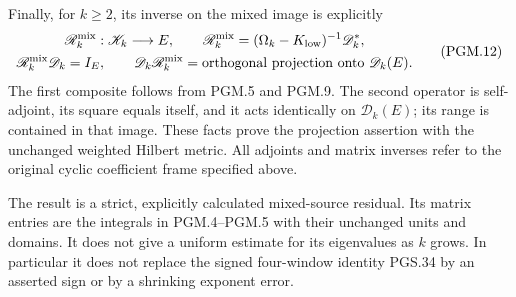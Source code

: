 Finally, for \(k\geq2\), its inverse on the mixed image is explicitly
\[
\begin{gathered}
 \mathscr R_k^{\rm mix}:\mathscr K_k\longrightarrow E,\qquad
 \mathscr R_k^{\rm mix}=(\Omega_k-K_{\rm low})^{-1}\mathscr D_k^*,
 \\
 \mathscr R_k^{\rm mix}\mathscr D_k=I_E,\qquad
 \mathscr D_k\mathscr R_k^{\rm mix}
       =\text{orthogonal projection onto }\mathscr D_k(E).
\end{gathered}
 \tag{PGM.12}\label{GraphV2:eq:pgm-left-inverse}
\]
The first composite follows from PGM.5 and PGM.9. The second
operator is self-adjoint, its square equals itself, and it acts
identically on \(\mathscr D_k(E)\); its range is contained in that
image. These facts prove the projection assertion with the
unchanged weighted Hilbert metric. All adjoints and matrix inverses
refer to the original cyclic coefficient frame specified above.

The result is a strict, explicitly calculated mixed-source residual.
Its matrix entries are the integrals in PGM.4--PGM.5 with their
unchanged units and domains. It does not give a uniform estimate
for its eigenvalues as \(k\) grows. In particular it does not replace
the signed four-window identity PGS.34 by an asserted sign or by a
shrinking exponent error.
